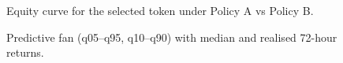 \documentclass[
  a4paper,
  DIV=11,
  numbers=noendperiod]{scrreprt}
\begin{document}
\begin{figure}


\caption{\label{fig-equity-token}Equity curve for the selected token
under Policy A vs Policy B.}

\end{figure}%

\begin{figure}


\caption{\label{fig-fan-token}Predictive fan (q05--q95, q10--q90) with
median and realised 72-hour returns.}

\end{figure}%
\end{document}
